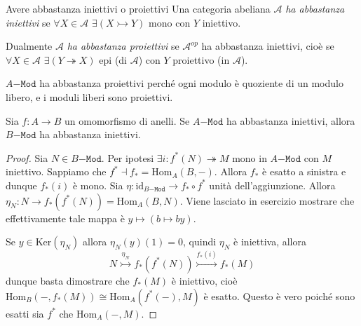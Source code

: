 \begin{definition}{Avere abbastanza iniettivi o proiettivi}
    Una categoria abeliana \(\mathcal{A}\) \emph{ha abbastanza iniettivi} se
    \(\forall X \in \mathcal{A}\) \(\exists (X \rightarrowtail Y)\) mono con \(Y\)
    iniettivo.

    Dualmente \(\mathcal{A}\) \emph{ha abbastanza proiettivi} se
    \(\mathcal{A}^{op}\) ha abbastanza iniettivi, cioè se \(\forall X \in
    \mathcal{A}\) \(\exists (Y \twoheadrightarrow X)\) epi (di \(\mathcal{A}\))
    con \(Y\) proiettivo (in \(\mathcal{A}\)).
\end{definition}

\begin{example}{}
    \(A\mathtt{-Mod}\) ha abbastanza proiettivi perché ogni modulo è quoziente
    di un modulo libero, e i moduli liberi sono proiettivi.
\end{example}

\begin{proposition}{}
    Sia \(f : A \to B\) un omomorfismo di anelli. Se \(A\mathtt{-Mod}\) ha
    abbastanza iniettivi, allora \(B\mathtt{-Mod}\) ha abbastanza iniettivi.
\end{proposition}

\begin{proof}{}
    Sia \(N \in B\mathtt{-Mod}\). Per ipotesi \(\exists i : f^{*}{(N)}
    \twoheadrightarrow M\) mono in \(A\mathtt{-Mod}\) con \(M\) iniettivo.
    Sappiamo che \(f^{*} \dashv f_* = \mathrm{Hom}_A{(B, -)}\). Allora \(f_*\) è
    esatto a sinistra e dunque \(f_*{(i)}\) è mono. Sia \(\eta :
    \mathrm{id}_{B\mathtt{-Mod}} \to f_* \circ f^{*}\) unità dell'aggiunzione.
    Allora \(\eta_N : N \to f_* {(f^{*}{(N)})} = \mathrm{Hom}_A{(B, N)}\). Viene
    lasciato in esercizio mostrare che effettivamente tale mappa è \(y \mapsto
    {(b \mapsto by)}\). 

    Se \(y \in \mathrm{Ker}{(\eta_N)}\) allora \(\eta_N{(y)}{(1)} = 0\), quindi
    \(\eta_N\) è iniettiva, allora
    \[
      N \overset{\eta_N}{\rightarrowtail } f_*{(f^{*}{(N)})}
      \overset{f_*{(i)}}{\rightarrowtail } f_*{(M)}
    \]
    dunque basta dimostrare che \(f_*{(M)}\) è iniettivo, cioè \\
    \(\mathrm{Hom}_B{(-, f_*{(M)})} \cong \mathrm{Hom}_A{(f^{*}{(-)}, M)}\) è esatto. Questo è vero poiché sono esatti
    sia \(f^{*}\) che \(\mathrm{Hom}_A{(-, M)}\).
\end{proof}


